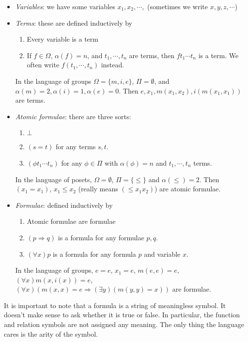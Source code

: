 \documentclass[a4paper]{article}
\begin{document}
\begin{defi}[Language]
  \begin{itemize}
    \item \emph{Variables}: we have some variables $x_1, x_2, \cdots, $ (sometimes we write $x, y, z, \cdots$)
    \item \emph{Terms}: these are defined inductively by
      \begin{enumerate}
        \item Every variable is a term
        \item If $f\in \Omega$, $\alpha(f) = n$, and $t_1, \cdots, t_n$ are terms, then $ft_1\cdots t_n$ is a term. We often write $f(t_1, \cdots, t_n)$ instead.
      \end{enumerate}
      \begin{eg}
        In the language of groups $\Omega = \{m, i, e\}$, $\Pi = \emptyset$, and $\alpha (m) = 2, \alpha(i) = 1, \alpha(e) = 0$. Then $e, x_1, m(x_1, x_2), i(m(x_1, x_1))$ are terms.
      \end{eg}
    \item \emph{Atomic formulae}: there are three sorts:
      \begin{enumerate}
        \item $\bot$
        \item $(s = t)$ for any terms $s, t$.
        \item $(\phi t_1 \cdots t_n)$ for any $\phi\in \Pi$ with $\alpha(\phi) = n$ and $t_1, \cdots, t_n$ terms.
      \end{enumerate}
      \begin{eg}
        In the language of posets, $\Omega = \emptyset$, $\Pi=\{\leq\}$ and $\alpha(\leq) = 2$. Then $(x_1 = x_1)$, $x_1\leq x_2$ (really means $(\leq x_1x_2)$) are atomic formulae.
      \end{eg}
    \item \emph{Formulae}: defined inductively by
      \begin{enumerate}
        \item Atomic formulae are formulae
        \item $(p \Rightarrow q)$ is a formula for any formulae $p, q$.
        \item $(\forall x) p$ is a formula for any formula $p$ and variable $x$.
      \end{enumerate}
      \begin{eg}
        In the language of groups, $e = e$, $x_1 = e$, $m(e, e) = e$, $(\forall x) m(x, i(x)) = e$, $(\forall x)(m(x, x) = e \Rightarrow (\exists y) (m(y, y) = x))$ are formulae.
      \end{eg}
  \end{itemize}
\end{defi}
It is important to note that a formula is a string of meaningless symbol. It doesn't make sense to ask whether it is true or false. In particular, the function and relation symbols are not assigned any meaning. The only thing the language cares is the arity of the symbol.
\end{document}
